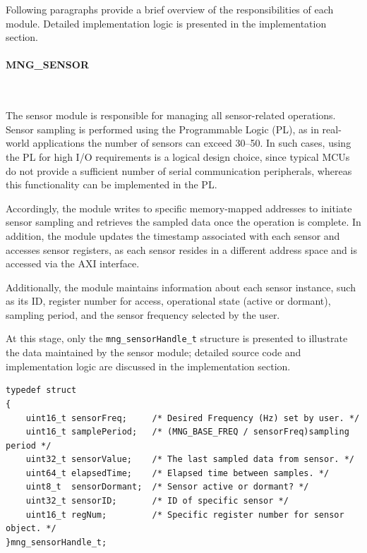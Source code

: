 \documentclass{article}
\begin{document}
Following paragraphs provide a brief overview of the responsibilities of each module. Detailed implementation logic is presented in the implementation section.


\paragraph{MNG\_SENSOR}\

The sensor module is responsible for managing all sensor-related operations. Sensor 
sampling is performed using the Programmable Logic (PL), as in real-world applications 
the number of sensors can exceed 30–50. In such cases, using the PL for high I/O 
requirements is a logical design choice, since typical MCUs do not provide a sufficient 
number of serial communication peripherals, whereas this functionality can be implemented 
in the PL.

Accordingly, the module writes to specific memory-mapped addresses to initiate sensor 
sampling and retrieves the sampled data once the operation is complete. In addition, 
the module updates the timestamp associated with each sensor and accesses sensor 
registers, as each sensor resides in a different address space and is accessed via the 
AXI interface.

Additionally, the module maintains information about each sensor instance, such as 
its ID, register number for access, operational state (active or dormant), sampling 
period, and the sensor frequency selected by the user.

At this stage, only the \texttt{mng\_sensorHandle\_t} structure is presented to illustrate 
the data maintained by the sensor module; detailed source code and implementation 
logic are discussed in the implementation section.


\begin{lstlisting}[caption={MNG Sensor handle structure}, label={lst:sensorhandle}]
typedef struct
{
    uint16_t sensorFreq;     /* Desired Frequency (Hz) set by user. */
    uint16_t samplePeriod;   /* (MNG_BASE_FREQ / sensorFreq)sampling period */
    uint32_t sensorValue;    /* The last sampled data from sensor. */
    uint64_t elapsedTime;    /* Elapsed time between samples. */
    uint8_t  sensorDormant;  /* Sensor active or dormant? */
    uint32_t sensorID;       /* ID of specific sensor */
    uint16_t regNum;         /* Specific register number for sensor object. */
}mng_sensorHandle_t;
\end{lstlisting}
\end{document}
